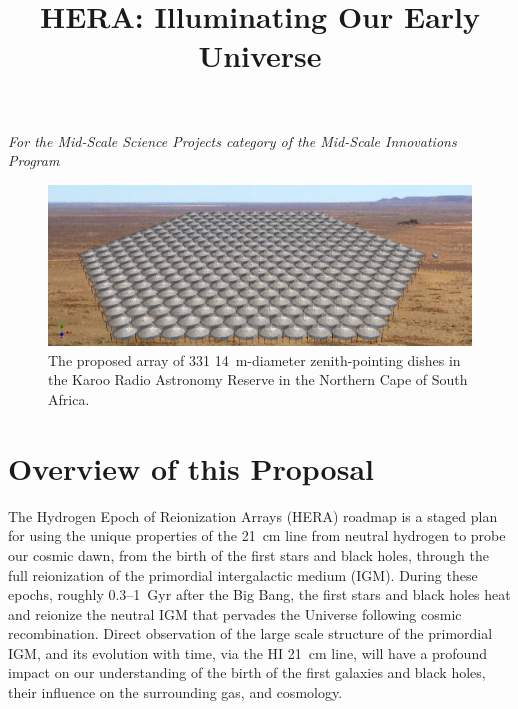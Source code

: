 \documentclass[preprint]{aastex}
\def\HI{{H{\small I }}}
\begin{document}
\title{HERA: Illuminating Our Early Universe}
{\it For the Mid-Scale Science Projects category of the Mid-Scale
Innovations Program}

\begin{figure}[H]\centering
\includegraphics[width=6in]{plots/hera331perspect2.jpg}
\caption{\small
The proposed array of 331 14~m-diameter zenith-pointing dishes in the Karoo Radio Astronomy Reserve
in the Northern Cape of South Africa.
}\label{fig:hera_array} \end{figure}


\vspace{-0.4in}
\section{Overview of this Proposal} %


The Hydrogen Epoch of Reionization Arrays (HERA) roadmap is a staged
plan for using the unique properties of the 21~cm line from neutral
hydrogen to probe our cosmic dawn, from the birth of the first 
stars and black holes, through the full reionization of the primordial
intergalactic medium (IGM). 
During these epochs, roughly 0.3--1~Gyr after the Big Bang, the
first stars and black holes heat and reionize the neutral
IGM that pervades the Universe following cosmic
recombination. Direct observation of the large scale structure of the primordial
IGM, and its evolution with time, via the \HI 21~cm line, will
have a profound impact on our understanding of the birth of the first
galaxies and black holes, their influence on the surrounding gas,
and cosmology. 
\end{document}
